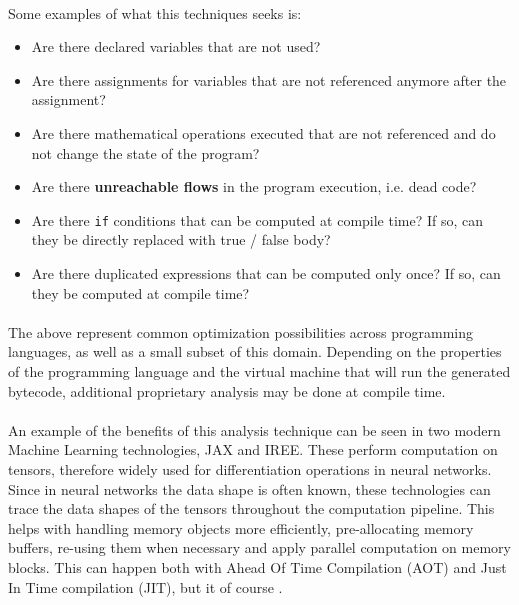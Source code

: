 \paragraph*{}
Some examples of what this techniques seeks is:
\begin{itemize}
    \item Are there declared variables that are not used?
    \item Are there assignments for variables that are not referenced anymore after the assignment?
    \item Are there mathematical operations executed that are not referenced and do not change the state of the program?
    \item Are there \textbf{unreachable flows} in the program execution, i.e. dead code?
    \item Are there \lstinline[columns=fixed]{if} conditions that can be computed at compile time? If so, can they be directly replaced with true / false body?
    \item Are there duplicated expressions that can be computed only once? If so, can they be computed at compile time?
\end{itemize}

\paragraph*{}
The above represent common optimization possibilities across programming languages, as well as a small subset of this domain. Depending on the properties of the programming language and the virtual machine that will run the generated bytecode, additional proprietary analysis may be done at compile time.

\paragraph*{}
An example of the benefits of this analysis technique can be seen in two modern Machine Learning technologies, JAX and IREE. These perform computation on tensors, therefore widely used for differentiation operations in neural networks. Since in neural networks the data shape is often known, these technologies can trace the data shapes of the tensors throughout the computation pipeline. This helps with handling memory objects more efficiently, pre-allocating memory buffers, re-using them when necessary and apply parallel computation on memory blocks. This can happen both with Ahead Of Time Compilation (AOT) and Just In Time compilation (JIT), but it of course \cite[requires array shapes to be static \& known at compile time]{jax-to-jit-or-not-to-jit}.

